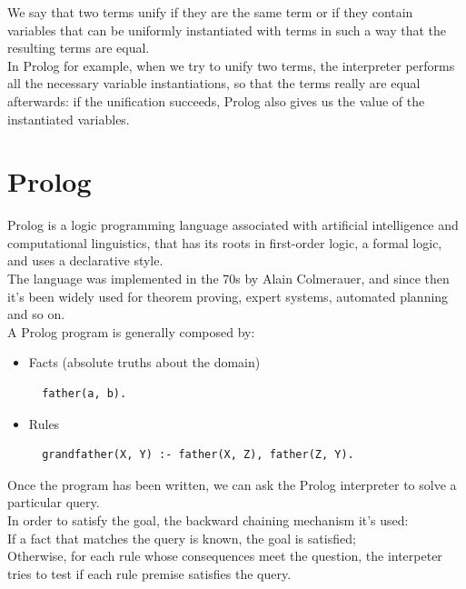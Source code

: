 \documentclass{article}
\begin{document}
We say that two terms unify if they are the same term or if they contain variables that can be uniformly instantiated with terms in such a way that the resulting terms are equal.\\

In Prolog for example, when we try to unify two terms, the interpreter performs all the necessary variable instantiations, so that the terms really are equal afterwards: if the unification succeeds, Prolog also gives us the value of the instantiated variables.\\

\pagebreak

\section{Prolog}
Prolog is a logic programming language associated with artificial intelligence and computational linguistics, that has its roots in first-order logic, a formal logic, and uses a declarative style.\\

The language was implemented in the 70s by Alain Colmerauer, and since then it's been widely used for theorem proving, expert systems, automated planning and so on.\\

A Prolog program is generally composed by:\\
\begin{itemize}
  \item Facts (absolute truths about the domain)
  \begin{verbatim}
  father(a, b).
  \end{verbatim}
  \item Rules
  \begin{verbatim}
  grandfather(X, Y) :- father(X, Z), father(Z, Y).
  \end{verbatim}
\end{itemize}

Once the program has been written, we can ask the Prolog interpreter to solve a particular query.\\

In order to satisfy the goal, the backward chaining mechanism it's used:\\

If a fact that matches the query is known, the goal is satisfied;\\
Otherwise, for each rule whose consequences meet the question, the interpeter tries to test if each rule premise satisfies the query.\\
\end{document}
